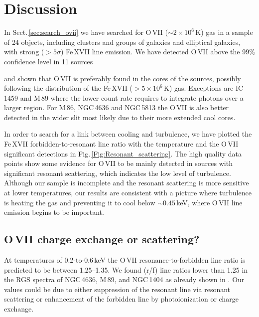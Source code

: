 \documentclass[useAMS,usenatbib]{mn2e}
\begin{document}
\section{Discussion}
\label{sec:discussion}

In Sect.\,\ref{sec:search_ovii} we have searched for O\,{\small VII} ($\sim 2 \times 10^6$\,K) 
gas in a sample of 24 objects, including clusters and groups of galaxies and elliptical galaxies,
with strong ($>5\sigma$) Fe\,{\small XVII} line emission.
We have detected O\,{\small VII} above the 99\% confidence level in 11 sources
{and shown that O\,{\small VII} is preferably found in the cores of the sources,
possibly following the distribution of the Fe\,{\small XVII} ($> 5 \times 10^6$\,K) gas.
Exceptions are IC\,1459 and M\,89 where the lower count rate requires to integrate
photons over a larger region. For M\,86, NGC\,4636 and NGC\,5813
the O\,{\small VII} is also better detected in the wider slit most likely due to 
their more extended cool cores.

In order to search for a link between cooling and turbulence, we have plotted the
Fe\,{\small XVII} forbidden-to-resonant line ratio with the temperature and the
O\,{\small VII} significant detections in Fig.\,\ref{Fig:Resonant_scattering}.
The high quality data points show some evidence 
for O\,{\small VII} to be mainly detected in sources 
with significant resonant scattering,
which indicates the low level of turbulence.
Although our sample is incomplete and the resonant scattering 
is more sensitive at lower temperatures,
our results are consistent with a picture where turbulence is heating the gas 
and preventing it to cool below $\sim0.45$\,keV, where O\,{\small VII} 
line emission begins to be important.

\subsection{O\,{\small VII} charge exchange or scattering?} \label{sec:ngc4636}

At temperatures of 0.2-to-0.6\,keV the O\,{\small VII} 
resonance-to-forbidden line ratio is predicted to be between 1.25--1.35. 
We found (r/f) line ratios lower than 1.25 in the RGS spectra of 
NGC\,4636, M\,89, and NGC\,1404 as already shown in \citet{Pinto2014}.
Our values could be due to either suppression of the resonant line 
via resonant scattering or enhancement of the forbidden line
by photoionization or charge exchange.

}
\end{document}
